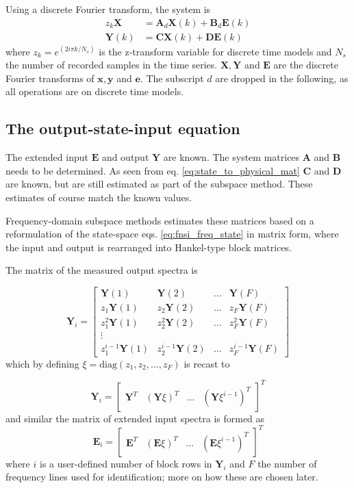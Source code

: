 Using a discrete Fourier transform, the system is
\begin{equation}
  \label{eq:fnsi_freq_state}
  \begin{aligned}
    z_k \bm X &= \bm A_d \bm X(k) + \bm B_d \bm E(k) \\
    \bm Y(k) &= \bm C \bm X(k) + \bm D \bm E(k)
\end{aligned}
\end{equation}
where $z_k = e^{(2i\pi k/N_s)}$ is the z-transform variable for discrete time
models and $N_s$ the number of recorded samples in the time series. $\bm X, \bm
Y$ and $\bm E$ are the discrete Fourier transforms of $\bm x, \bm y$ and $\bm
e$. The subscript $d$ are dropped in the following, as all operations are on
discrete time models.

\subsection{The output-state-input equation}

The extended input $\bm E$ and output $\bm Y$ are known. The system matrices $\bm
A$ and $\bm B$ needs to be determined. As seen from eq.
\eqref{eq:state_to_physical_mat} $\bm C$ and $\bm D$ are known, but are still
estimated as part of the subspace method. These estimates of course match the
known values.

Frequency-domain subspace methods estimates these matrices based on a
reformulation of the state-space eqs. \eqref{eq:fnsi_freq_state} in matrix form,
where the input and output is rearranged into Hankel-type block matrices.

The matrix of the measured output spectra is

\begin{equation}
  \bm Y_i =
  \begin{bmatrix}
    \bm Y(1) & \bm Y(2) & \dots & \bm Y(F) \\
    z_1\bm Y(1) & z_2\bm Y(2) & \dots & z_F\bm Y(F) \\
    z^2_1\bm Y(1) & z^2_2\bm Y(2) & \dots & z^2_F\bm Y(F) \\
    \vdots \\
    z^{i-1}_1\bm Y(1) & z^{i-1}_2\bm Y(2) & \dots & z^{i-1}_F\bm Y(F)
  \end{bmatrix}
\end{equation}
which by defining $\xi = \text{diag}(z_1, z_2, \dots, z_F)$ is recast to

\begin{equation}
  \bm Y_i =
  \begin{bmatrix}
    \bm Y^T & (\bm Y \xi)^T & \dots & (\bm Y \xi^{i-1})^T
  \end{bmatrix}^T
\end{equation}
and similar the matrix of extended input spectra is formed as
\begin{equation}
  \bm E_i =
    \begin{bmatrix}
      \bm E^T & (\bm E \xi)^T & \dots & (\bm E \xi^{i-1})^T
    \end{bmatrix}^T
\end{equation}
where $i$ is a user-defined number of block rows in $\bm Y_i$ and $F$ the number
of frequency lines used for identification; more on how these are chosen later.

